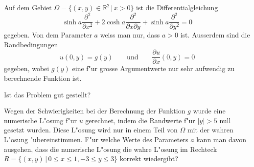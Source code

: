 Auf dem Gebiet $\Omega=\{(x,y)\in\mathbb R^2\,|\, x>0\}$ ist die
Differentialgleichung
\[
\sinh a \frac{\partial^2}{\partial x^2}
+
2\cosh a \frac{\partial^2}{\partial x\partial y}
+
\sinh a \frac{\partial^2}{\partial y^2}
=
0
\]
gegeben.
Von dem Parameter $a$ weiss man nur, dass $a>0$ ist.
Ausserdem sind die Randbedingungen
\[
u(0,y)=g(y)\qquad\text{und}\qquad \frac{\partial u}{\partial x}(0,y)=0
\]
gegeben, wobei $g(y)$ eine f"ur grosse Argumentwerte nur sehr aufwendig zu
berechnende Funktion ist.
\begin{teilaufgaben}
\item
Ist das Problem gut gestellt?
\item
Wegen der Schwierigkeiten bei der Berechnung der Funktion $g$
wurde eine numerische L"osung f"ur $u$ gerechnet, indem die
Randwerte f"ur $|y|>5$ null gesetzt wurden.
Diese L"osung wird nur in einem Teil von $\Omega$ mit der wahren L"osung
"ubereinstimmen.
F"ur welche Werte des Parameters $a$ kann man davon ausgehen, dass die
numerische L"osung die wahre L"osung im Rechteck
$R=\{(x,y)\,|\, 0\le x\le 1,-3\le y\le 3\}$ korrekt
wiedergibt?
\end{teilaufgaben}


